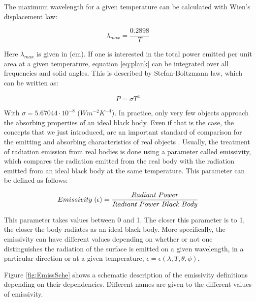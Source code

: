 The maximum wavelength for a given temperature can be calculated with Wien's displacement law:

\begin{equation}
    \lambda_{max} = \frac{0.2898}{T}
\end{equation}

Here $\lambda_{max}$ is given in (cm). If one is interested in the total power emitted per unit area at a given temperature, equation \ref{eq:plank} can be integrated over all frequencies and solid angles. This is described by Stefan-Boltzmann law, which can be written as: 

\begin{equation}
    P = \sigma T^4
\end{equation}

With $\sigma = 5.67044\cdot 10^{-8}$ ($W m^{-2} K^{-4}$). In practice, only very few objects approach the absorbing properties of an ideal black body. Even if that is the case, the concepts that we just introduced, are an important standard of comparison for the emitting and absorbing characteristics of real objects \parencite[][]{ref:Usefulbook}. Usually, the treatment of radiation emission from real bodies is done using a parameter called emissivity, which compares the radiation emitted from the real body with the radiation emitted from an ideal black body at the same temperature. This parameter can be defined as follows:

\begin{equation}
    Emissivity \hspace{0.1cm} (\epsilon) = \frac{Radiant \hspace{0.1cm}  Power }{Radiant \hspace{0.1cm}  Power \hspace{0.1cm} Black\hspace{0.1cm}  Body}
\end{equation}

This parameter takes values between 0 and 1. The closer this parameter is to 1, the closer the body radiates as an ideal black body. More specifically, the emissivity can have different values depending on whether or not one distinguishes the radiation of the surface is emitted on a given wavelength, in a particular direction or at a given temperature, $\epsilon = \epsilon(\lambda , T, \theta, \phi)$.

Figure \ref{fig:EmissSche} shows a schematic description of the emissivity definitions depending on their dependencies. Different names are given to the different values of emissivity. 



